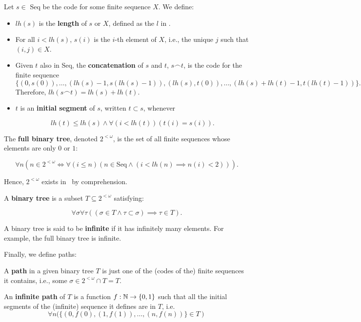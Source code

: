 \documentclass[../main.tex]{memoir}
\begin{document}
\begin{definition}
  Let $s \in$ Seq be the code for some finite sequence $X$. We define:

  \begin{itemize}
  \item $lh(s)$ is the \textbf{length} of $s$ or $X$, defined as the $l$ in .
  \item For all $i < lh(s)$, $s(i)$ is the $i$-th element of $X$, i.e., the unique $j$ such that $(i, j) \in X$.
  \item Given $t$ also in Seq, the \textbf{concatenation} of $s$ and $t$, $s \frown t$, is the code for the finite sequence
    \[ \{(0, s(0)), \ldots, (lh(s) - 1, s(lh(s) - 1)),
      (lh(s), t(0)), \ldots, (lh(s) + lh(t) - 1, t(lh(t) - 1))\}. \]
    Therefore, $lh(s \frown t) = lh(s) + lh(t)$.
  \item $t$ is an \textbf{initial segment} of $s$, written $t \subset s$, whenever

    \[ lh(t) \le lh(s) \land \forall (i < lh(t)) (t(i) = s(i)). \]
  \end{itemize}
\end{definition}

\begin{definition}[Trees]
  The \textbf{full binary tree}, denoted $2^{<\omega}$, is the set of all finite sequences whose elements are only $0$ or $1$:

  \[ \forall n (n \in 2^{<\omega} \iff \forall (i \le n) (n \in \text{Seq} \land (i < lh(n) \implies n(i) < 2))). \]

  Hence, $2^{<\omega}$ exists in \rca\ by  comprehension.

  A \textbf{binary tree} is a subset $T \subseteq 2^{<\omega}$ satisfying:

  \[ \forall \sigma \forall \tau ((\sigma \in T \land \tau \subset \sigma) \implies \tau \in T). \]

  A binary tree is said to be \textbf{infinite} if it has infinitely many elements. For example, the full binary tree is infinite.
\end{definition}

Finally, we define paths:

\begin{definition}
  A \textbf{path} in a given binary tree $T$ is just one of the (codes of the) finite sequences it contains, i.e., some $\sigma \in 2^{<\omega} \cap T = T$.

  An \textbf{infinite path} of $T$ is a function $f: \mathbb{N} \to \{0, 1\}$ such that all the initial segments of the (infinite) sequence it defines are in $T$, i.e.
  \[ \forall n (\{(0, f(0), (1, f(1)), \ldots, (n, f(n))\} \in T) \]
\end{definition}
\end{document}
